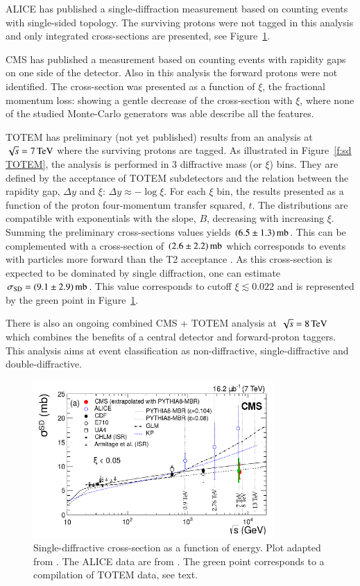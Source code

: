 \documentclass{webofc}
\def\un#1{\,{\rm #1}}
\begin{document}
ALICE has published \cite{alice-inel-sd-dd} a single-diffraction measurement based on counting events with single-sided topology. The surviving protons were not tagged in this analysis and only integrated cross-sections are presented, see Figure~\ref{f:sd cs summary}.

CMS has published \cite{cms-diff-7tev} a measurement based on counting events with rapidity gaps on one side of the detector. Also in this analysis the forward protons were not identified. The cross-section was presented as a function of $\xi$, the fractional momentum loss: showing a gentle decrease of the cross-section with $\xi$, where none of the studied Monte-Carlo generators was able describe all the features.

TOTEM has preliminary (not yet published) results from an analysis at $\sqrt s = 7\un{TeV}$ where the surviving protons are tagged. As illustrated in Figure~\ref{f:sd TOTEM}, the analysis is performed in 3 diffractive mass (or $\xi$) bins. They are defined by the acceptance of TOTEM subdetectors and the relation between the rapidity gap, $\Delta y$ and $\xi$: $\Delta y \approx -\log\xi$. For each $\xi$ bin, the results presented as a function of the proton four-momentum transfer squared, $t$. The distributions are compatible with exponentials with the slope, $B$, decreasing with increasing $\xi$. Summing the preliminary cross-sections values yields $(6.5\pm 1.3)\un{mb}$. This can be complemented with a cross-section of $(2.6\pm 2.2)\un{mb}$ which corresponds to events with particles more forward than the T2 acceptance \cite{totem-si-inel-7tev}. As this cross-section is expected to be dominated by single diffraction, one can estimate $\sigma_{\rm SD} = (9.1 \pm 2.9)\un{mb}$. This value corresponds to cutoff $\xi \lesssim 0.022$ and is represented by the green point in Figure~\ref{f:sd cs summary}.

There is also an ongoing combined CMS + TOTEM analysis at $\sqrt s = 8\un{TeV}$ which combines the benefits of a central detector and forward-proton taggers. This analysis aims at event classification as non-diffractive, single-diffractive and double-diffractive.

\begin{figure}[h]
\centering
\includegraphics[height=6cm,clip]{fig/si_sd_vs_s.pdf}
\vskip-4mm
\caption{Single-diffractive cross-section as a function of energy. Plot adapted from \cite{cms-diff-7tev}. The ALICE data are from \cite{alice-inel-sd-dd}. The green point corresponds to a compilation of TOTEM data, see text.
}
\label{f:sd cs summary}
\end{figure}
\end{document}
